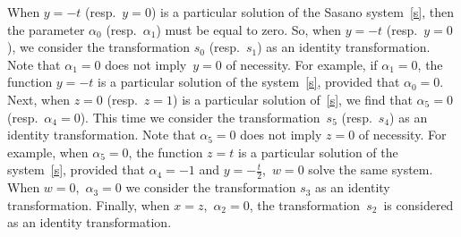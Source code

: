 \documentclass[pdftex]{sigma}
\numberwithin{equation}{section}
\begin{document}
 \begin{Remark}\label{tr}
 When $y=-t$ (resp.\ $y=0$) is a particular solution of the Sasano system~\eqref{s}, then the parameter
 $\alpha_0$ (resp.\ $\alpha_1$) must be equal to zero. So, when $y=-t$ (resp.\ $y=0$), we consider the
 transformation $s_0$ (resp.\ $s_1$) as an identity transformation.
 Note that $\alpha_1=0$ does not imply~${y=0}$ of necessity.
 For example, if $\alpha_1=0$, the function $y=-t$ is a particular solution of the system~\eqref{s}, provided that
 $\alpha_0=0$.
 Next, when $z=0$ (resp.\ $z=1$) is a particular solution of~\eqref{s}, we find that $\alpha_5=0$ (resp.\ $\alpha_4=0$).
 This time we consider the transformation~$s_5$ (resp.~$s_4$) as an identity transformation.
 Note that $\alpha_5=0$ does not imply $z=0$ of necessity. For example, when $\alpha_5=0$, the function
 $z=t$ is a particular solution of the system~\eqref{s}, provided that $\alpha_4=-1$ and $y=-\frac{t}{2}$,~$w=0$ solve
 the same system. When $w=0$,~$\alpha_3=0$ we consider the transformation $s_3$ as an identity transformation.
 Finally, when $x=z$,~$\alpha_2=0$,
 the transformation~$s_2$~is considered as an identity transformation.
 \end{Remark}
\end{document}
